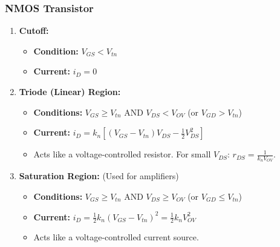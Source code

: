 \documentclass[12pt, letterpaper]{article}
\begin{document}
\subsubsection*{NMOS Transistor}
\begin{enumerate}
    \item \textbf{Cutoff:}
    \begin{itemize}
        \item \textbf{Condition:} $V_{GS} < V_{tn}$
        \item \textbf{Current:} $i_D = 0$
    \end{itemize}
    
    \item \textbf{Triode (Linear) Region:}
    \begin{itemize}
        \item \textbf{Conditions:} $V_{GS} \ge V_{tn}$ AND $V_{DS} < V_{OV}$ (or $V_{GD} > V_{tn}$)
        \item \textbf{Current:} $i_D = k_n \left[ (V_{GS} - V_{tn})V_{DS} - \frac{1}{2}V_{DS}^2 \right]$
        \item Acts like a voltage-controlled resistor. For small $V_{DS}$: $r_{DS} = \frac{1}{k_n V_{OV}}$.
    \end{itemize}
    
    \item \textbf{Saturation Region:} (Used for amplifiers)
    \begin{itemize}
        \item \textbf{Conditions:} $V_{GS} \ge V_{tn}$ AND $V_{DS} \ge V_{OV}$ (or $V_{GD} \le V_{tn}$)
        \item \textbf{Current:} $i_D = \frac{1}{2} k_n (V_{GS} - V_{tn})^2 = \frac{1}{2} k_n V_{OV}^2$
        \item Acts like a voltage-controlled current source.
    \end{itemize}
\end{enumerate}
\end{document}
